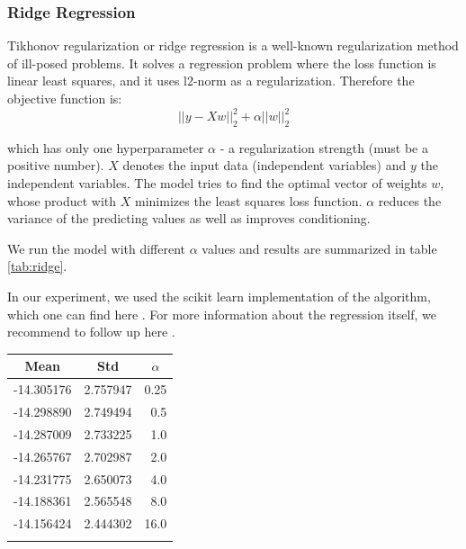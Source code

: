 \documentclass[sigplan,\review anonymous]{acmart}
\newcommand*{\thead}[1]{\multicolumn{1}{c}{\bfseries #1}}
\begin{document}

\subsubsection{Ridge Regression}

Tikhonov regularization or ridge regression is a well-known regularization
method of ill-posed problems. It solves a regression problem where the loss
function is linear least squares, and it uses l2-norm as a regularization.
Therefore the objective function is:
\begin{equation}
||y - Xw||^2_2 + \alpha ||w||^2_2
\end{equation}

\noindent which has only one hyperparameter $\alpha$ - a regularization
strength (must be a positive number). $X$ denotes the input data (independent
variables) and $y$ the independent variables. The model tries to find the
optimal vector of weights $w$, whose product with $X$ minimizes the least
squares \cite{least_squares} loss function. $\alpha$ reduces the variance
of the predicting values as well as improves conditioning.

We run the model with different $\alpha$ values and results are summarized
in table \ref{tab:ridge}.

In our experiment, we used the scikit learn implementation of the algorithm,
which one can find here \cite{scikit_ridge}. For more information about the
regression itself, we recommend to follow up here \cite{wiki_ridge}.

\begin{center}
  \begin{tabular}{ l c r }
  \hline
  \thead{Mean} & \thead{Std} & \thead{$\alpha$} \\
  \hline
  -14.305176 & 2.757947 & 0.25 \\
  -14.298890 & 2.749494 & 0.5 \\
  -14.287009 & 2.733225 & 1.0 \\
  -14.265767 & 2.702987 & 2.0 \\
  -14.231775 & 2.650073 & 4.0 \\
  -14.188361 & 2.565548 & 8.0 \\
  -14.156424 & 2.444302 & 16.0 \\
  \hline
  \label{tab:ridge}
  \end{tabular}
\end{center}
\end{document}
